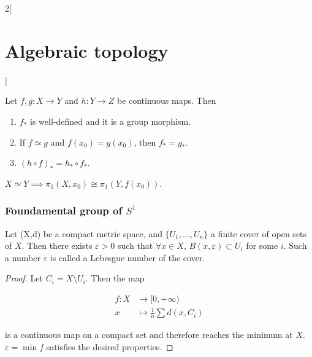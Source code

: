 \documentclass[../../../main_math.tex]{subfiles}
\begin{document}
\begin{multicols}{2}[\section{Algebraic topology}]
\begin{definition}
	\end{definition}

	\begin{proposition}
		Let $f,g:X\to Y$ and $h:Y \to Z $ be continuous maps. Then
		\begin{enumerate}
			\item $f_*$ is well-defined and it is a group morphism.
			\item If $f\simeq g$ and $f(x_0)=g(x_0)$, then $f_*=g_*$.
			\item $(h\circ f)_*=h_*\circ f_*$.
		\end{enumerate}
	\end{proposition}

	\begin{corollary}
		$X\simeq Y \implies \pi_1 (X,x_0) \cong \pi_1 (Y,f(x_0))$.
	\end{corollary}



	\subsubsection{Foundamental group of $S^1$}
	
	\begin{lemma}
		Let (X,d) be a compact metric space, and $\{U_1, ..., U_n\}$ a finite cover of open sets of $X$. Then there exists $\varepsilon>0$ such that $\forall x \in X$, $B(x,\varepsilon)\subset U_i$ for some $i$. Such a number $\varepsilon$ is called a Lebesgue number of the cover.
	\end{lemma}

	\begin{proof}
		Let $C_i=X\setminus U_i$.  Then the map 
		
		\begin{align*}			
			f:X &\longrightarrow [0, +\infty) \\
			x &\longmapsto \frac{1}{n} \sum d(x,C_i)			
		\end{align*}
		
		is a continuous map on a compact set and therefore reaches the minimum at $X$. $\varepsilon=\min f$ satisfies the desired properties.
	\end{proof}
	

\end{multicols}
\end{document}
